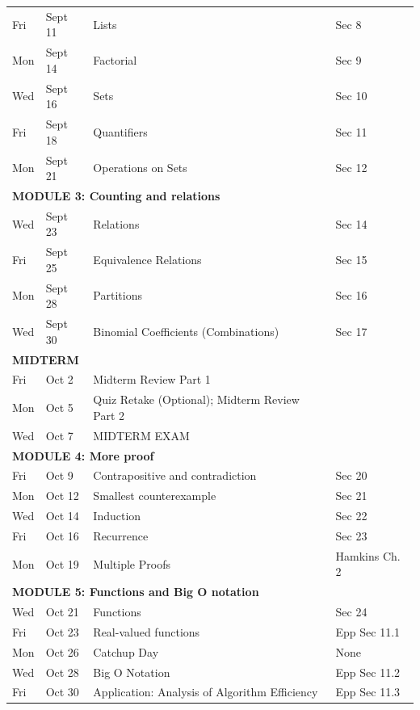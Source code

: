 \documentclass[letterpaper]{inzane_syllabus} %
\begin{document}
\begin{center}
\begin{tabularx}{\textwidth}{p{2cm}p{2cm}p{8cm}p{9.5cm}}
Fri & Sept 11 & Lists & Sec 8 \\
Mon & Sept 14 & Factorial & Sec 9 \\
Wed & Sept 16 & Sets & Sec 10 \\
Fri & Sept 18 & Quantifiers &  Sec 11  \\
Mon & Sept 21 & Operations on Sets & Sec 12 \\
\hline
\multicolumn{4}{l}{\textbf{\textcolor{myCOLOR}{\large MODULE 3: Counting and relations}}} \\
\hline
Wed & Sept 23 & Relations & Sec 14 \\
Fri & Sept 25 & Equivalence Relations & Sec 15 \\
Mon & Sept 28 & Partitions & Sec 16 \\
Wed & Sept 30 & Binomial Coefficients (Combinations) & Sec 17  \\
\hline
\multicolumn{4}{l}{\textbf{\textcolor{myCOLOR}{\large MIDTERM}}} \\
\hline
Fri & Oct 2 & Midterm Review Part 1 & \\
Mon & Oct 5 & Quiz Retake (Optional); Midterm Review Part 2  & \\
Wed & Oct 7 & MIDTERM EXAM & \\
\hline
\multicolumn{4}{l}{\textbf{\textcolor{myCOLOR}{\large MODULE 4: More proof}}} \\
\hline

Fri & Oct 9 & Contrapositive and contradiction & Sec 20 \\
Mon & Oct 12 & Smallest counterexample & Sec 21 \\
Wed & Oct 14 & Induction & Sec 22  \\
Fri & Oct 16 & Recurrence  & Sec 23 \\
Mon & Oct 19 & Multiple Proofs  & Hamkins Ch. 2\\
\hline
\multicolumn{4}{l}{\textbf{\textcolor{myCOLOR}{\large MODULE 5: Functions and Big O notation}}} \\
\hline
Wed &  Oct 21  & Functions & Sec 24 \\
Fri &  Oct 23  & Real-valued functions & Epp Sec 11.1 \\
Mon &  Oct 26 & Catchup Day & None \\
Wed &  Oct 28 & Big O Notation & Epp Sec 11.2 \\
Fri & Oct 30 & Application: Analysis of Algorithm Efficiency & Epp Sec 11.3 \\


\end{tabularx}
\end{center}
\end{document}
